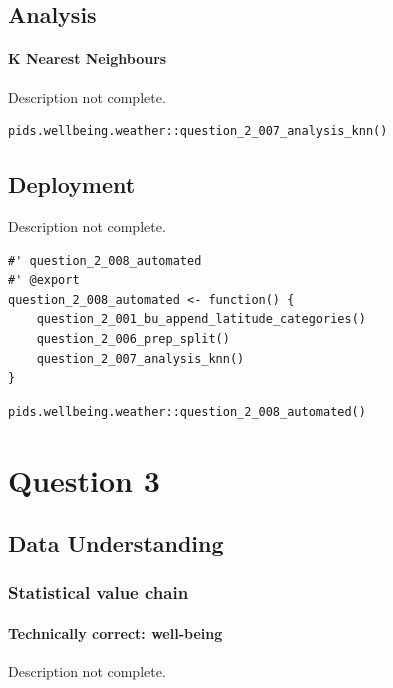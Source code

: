 \documentclass[12pt, oneside, openany]{book}
\begin{document}
\section*{Analysis}

\subsubsection*{K Nearest Neighbours}
\color{red}Description not complete\color{black}.

\bigskip
\begin{lstlisting}
pids.wellbeing.weather::question_2_007_analysis_knn()
\end{lstlisting}

\section*{Deployment}
\color{red}Description not complete\color{black}.

\begin{lstlisting}
#' question_2_008_automated
#' @export
question_2_008_automated <- function() {
	question_2_001_bu_append_latitude_categories()
	question_2_006_prep_split()
	question_2_007_analysis_knn()
}
\end{lstlisting}

\begin{lstlisting}
pids.wellbeing.weather::question_2_008_automated()
\end{lstlisting}

\setcounter{equation}{0}
\chapter*{Question 3}

\section*{Data Understanding}

\subsection*{Statistical value chain}

\subsubsection*{Technically correct: well-being}
\color{red}Description not complete\color{black}.
\end{document}
